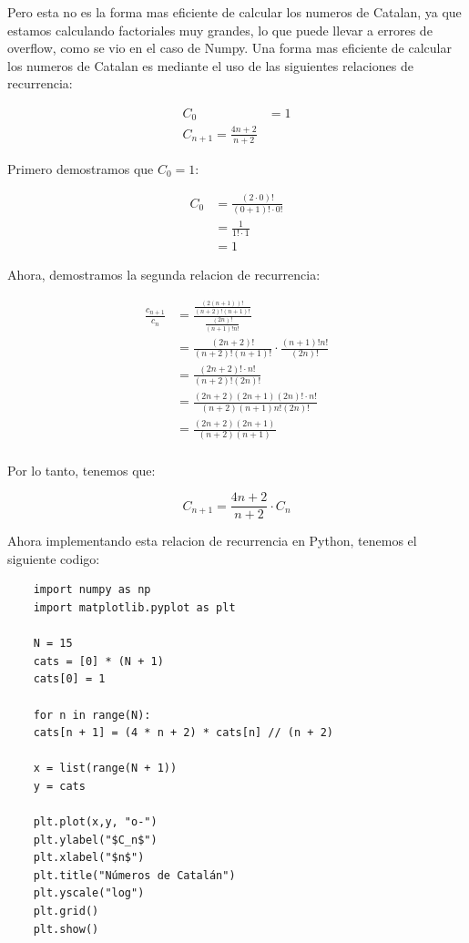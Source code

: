 \documentclass[../portafolio.tex]{subfiles}
\begin{document}
Pero esta no es la forma mas eficiente de calcular los numeros de Catalan, ya que estamos calculando factoriales
muy grandes, lo que puede llevar a errores de overflow, como se vio en el caso de Numpy. Una forma mas eficiente
de calcular los numeros de Catalan es mediante el uso de las siguientes relaciones de recurrencia:

\begin{align}
    C_0 & = 1 \\ C_{n+1} = \frac{4n+2}{n+2}
\end{align}

Primero demostramos que $C_0 = 1$:

\begin{align}
    C_0 &= \frac{(2\cdot 0)!}{(0+1)! \cdot 0!} \\
        &= \frac{1}{1! \cdot 1} \\
        &= 1
\end{align}


Ahora, demostramos la segunda relacion de recurrencia:

\begin{align}
    \frac{c_{n+1}}{c_n} &= \frac{\frac{(2(n+1))!}{(n+2)! (n+1)!}}{\frac{(2n)!}{(n+1)! n!}} \\
                        &= \frac{(2n+2)!}{(n+2)! (n+1)!} \cdot \frac{(n+1)! n!}{(2n)!} \\
                        &= \frac{(2n+2)! \cdot n!}{(n+2)! (2n)!} \\
                        &= \frac{(2n+2)(2n+1)(2n)! \cdot n!}{(n+2)(n+1) n! (2n)!} \\
                        &= \frac{(2n+2)(2n+1)}{(n+2)(n+1)} \\
\end{align}

Por lo tanto, tenemos que:

\begin{equation}
    C_{n+1} = \frac{4n+2}{n+2} \cdot C_n
\end{equation}

Ahora implementando esta relacion de recurrencia en Python, tenemos el siguiente codigo:

\begin{lstlisting}
    import numpy as np
    import matplotlib.pyplot as plt

    N = 15
    cats = [0] * (N + 1)
    cats[0] = 1

    for n in range(N):
    cats[n + 1] = (4 * n + 2) * cats[n] // (n + 2)

    x = list(range(N + 1))
    y = cats

    plt.plot(x,y, "o-")
    plt.ylabel("$C_n$")
    plt.xlabel("$n$")
    plt.title("Números de Catalán")
    plt.yscale("log")
    plt.grid()
    plt.show()  
\end{lstlisting}
\end{document}
